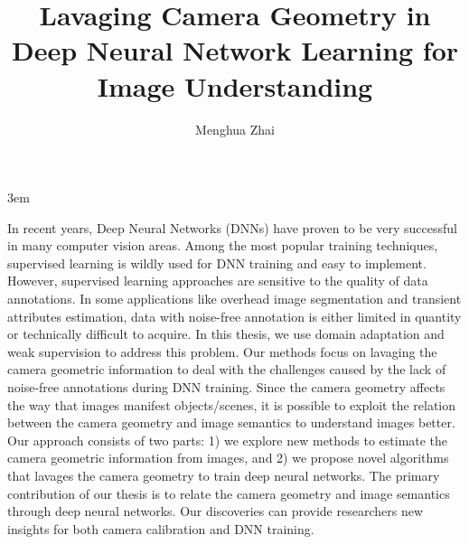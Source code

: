 \documentclass[final]{ukthesis}
\begin{document}
\emergencystretch 3em

\author{Menghua Zhai}
\title{Lavaging Camera Geometry in Deep Neural Network Learning for Image Understanding}

\abstract
{ \SingleSpacing
In recent years, Deep Neural Networks (DNNs) have proven to be very
successful in many computer vision areas. Among the most popular
training techniques, supervised learning is wildly used for DNN
training and easy to implement. However, supervised
learning approaches are sensitive to the quality of data
annotations. In some applications like overhead image segmentation and
transient attributes estimation, data with noise-free annotation is
either limited in quantity or technically difficult to acquire.
In this thesis, we use domain adaptation and weak supervision to
address this problem. Our methods focus on lavaging the camera
geometric information to deal with the challenges caused by the lack
of noise-free annotations during DNN training.
Since the camera geometry affects the way that images manifest
objects/scenes, it is possible to exploit the relation between the
camera geometry and image semantics to understand images better.
Our approach consists of two parts: 1) we explore new methods
to estimate the camera geometric information from images, and 2) 
we propose novel algorithms that lavages the camera geometry to train
deep neural networks.
The primary contribution of our thesis is to relate the camera
geometry and image semantics through deep neural networks. Our
discoveries can provide researchers new insights for both camera
calibration and DNN training.
}


\frontmatter
\maketitle



\tableofcontents\clearpage

\mainmatter




\backmatter




\end{document}
